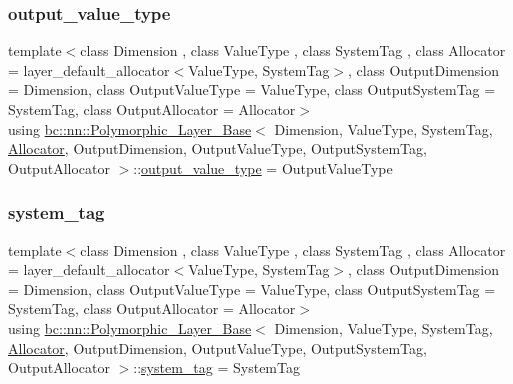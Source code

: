 \mbox{\label{structbc_1_1nn_1_1Polymorphic__Layer__Base_a15d1092569f56625cbdf8d7045e66391}} 
\subsubsection{\texorpdfstring{output\+\_\+value\+\_\+type}{output\_value\_type}\hspace{0.1cm}{\footnotesize\ttfamily [2/2]}}
{\footnotesize\ttfamily template$<$class Dimension , class Value\+Type , class System\+Tag , class Allocator  = layer\+\_\+default\+\_\+allocator$<$\+Value\+Type, System\+Tag$>$, class Output\+Dimension  = Dimension, class Output\+Value\+Type  = Value\+Type, class Output\+System\+Tag  = System\+Tag, class Output\+Allocator  = Allocator$>$ \\
using \hyperlink{structbc_1_1nn_1_1Polymorphic__Layer__Base}{bc\+::nn\+::\+Polymorphic\+\_\+\+Layer\+\_\+\+Base}$<$ Dimension, Value\+Type, System\+Tag, \hyperlink{classbc_1_1allocators_1_1Allocator}{Allocator}, Output\+Dimension, Output\+Value\+Type, Output\+System\+Tag, Output\+Allocator $>$\+::\hyperlink{structbc_1_1nn_1_1Polymorphic__Layer__Base_a15d1092569f56625cbdf8d7045e66391}{output\+\_\+value\+\_\+type} =  Output\+Value\+Type}

\mbox{\label{structbc_1_1nn_1_1Polymorphic__Layer__Base_a038901ff126b59392a45ffb2d839b3b0}} 
\subsubsection{\texorpdfstring{system\+\_\+tag}{system\_tag}\hspace{0.1cm}{\footnotesize\ttfamily [1/2]}}
{\footnotesize\ttfamily template$<$class Dimension , class Value\+Type , class System\+Tag , class Allocator  = layer\+\_\+default\+\_\+allocator$<$\+Value\+Type, System\+Tag$>$, class Output\+Dimension  = Dimension, class Output\+Value\+Type  = Value\+Type, class Output\+System\+Tag  = System\+Tag, class Output\+Allocator  = Allocator$>$ \\
using \hyperlink{structbc_1_1nn_1_1Polymorphic__Layer__Base}{bc\+::nn\+::\+Polymorphic\+\_\+\+Layer\+\_\+\+Base}$<$ Dimension, Value\+Type, System\+Tag, \hyperlink{classbc_1_1allocators_1_1Allocator}{Allocator}, Output\+Dimension, Output\+Value\+Type, Output\+System\+Tag, Output\+Allocator $>$\+::\hyperlink{structbc_1_1nn_1_1Polymorphic__Layer__Base_a038901ff126b59392a45ffb2d839b3b0}{system\+\_\+tag} =  System\+Tag}

